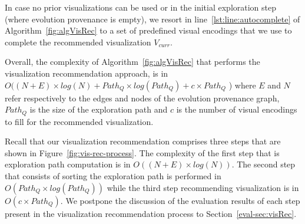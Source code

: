 In case no prior visualizations can be used or in the initial exploration step (where evolution provenance is empty), we resort in line~\ref{lst:line:autocomplete} of Algorithm~\ref{fig:algVisRec} to a set of predefined visual encodings that we use to complete the recommended visualization $V_{curr}$.




Overall, the complexity of Algorithm~\ref{fig:algVisRec} that performs the visualization recommendation approach, is in 
$O((N+E) \times log (N)   +  Path_Q \times log(Path_Q) + c \times Path_Q$ ) where
$E$ and $N$ refer respectively to the edges and nodes of the evolution provenance graph, $Path_Q$ is the size of the exploration path and $c$ is the number of visual encodings to fill for the recommended visualization.

Recall that our visualization recommendation comprises three steps that are shown in Figure~\ref{fig:vis-rec-process}. The complexity of the first step that is exploration path computation is in $O((N+E) \times log (N) )$.
The second step that consists of sorting the exploration path is performed in $O(Path_Q \times log(Path_Q))$ while the third step recommending visualization is in $O(c \times Path_Q)$.
We postpone the discussion of the evaluation results of each step present in the visualization recommendation process to Section~\ref{eval-sec:visRec}.

